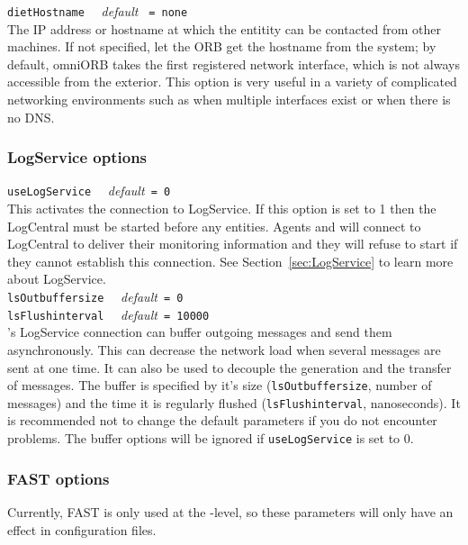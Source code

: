 \noindent
\texttt{dietHostname} \ \ \emph{default} \texttt{ = none }\\ The IP address or
hostname at which the entitity can be contacted from other machines. If not
specified, let the ORB get the hostname from the system; by default, omniORB
takes the first registered network interface, which is not always accessible
from the exterior.  This option is very useful in a variety of complicated
networking environments such as when multiple interfaces exist or when there is
no DNS.

\subsubsection{LogService options}

\noindent
\texttt{useLogService} \ \ \emph{default}\texttt{ = 0}\\ This activates the
connection to LogService. If this option is set to 1 then the LogCentral must
be started before any \diet entities. Agents and \seds will connect to
LogCentral to deliver their monitoring information and they will refuse to
start if they cannot establish this connection. See
Section~\ref{sec:LogService} to learn more about LogService.\\

\noindent
\texttt{lsOutbuffersize} \ \ \emph{default}\texttt{ = 0}\\
\noindent
\texttt{lsFlushinterval} \ \ \emph{default}\texttt{ = 10000}\\ \diet's
LogService connection can buffer outgoing messages and send them
asynchronously. This can decrease the network load when several messages are
sent at one time. It can also be used to decouple the generation and the
transfer of messages. The buffer is specified by it's size
(\texttt{lsOutbuffersize}, number of messages) and the time it is regularly
flushed (\texttt{lsFlushinterval}, nanoseconds). It is recommended not to
change the default parameters if you do not encounter problems. The buffer
options will be ignored if \texttt{useLogService} is set to 0.


\subsubsection{FAST options}

\noindent
Currently, FAST is only used at the \sed-level, so these parameters will only
have an effect in \sed configuration files.\\

